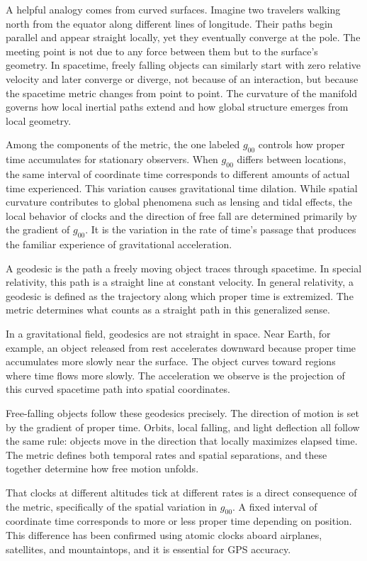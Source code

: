 A helpful analogy comes from curved surfaces. Imagine two travelers walking north from the equator along different lines of longitude. Their paths begin parallel and appear straight locally, yet they eventually converge at the pole. The meeting point is not due to any force between them but to the surface’s geometry. In spacetime, freely falling objects can similarly start with zero relative velocity and later converge or diverge, not because of an interaction, but because the spacetime metric changes from point to point. The curvature of the manifold governs how local inertial paths extend and how global structure emerges from local geometry.

Among the components of the metric, the one labeled \( g_{00} \) controls how proper time accumulates for stationary observers. When \( g_{00} \) differs between locations, the same interval of coordinate time corresponds to different amounts of actual time experienced. This variation causes gravitational time dilation. While spatial curvature contributes to global phenomena such as lensing and tidal effects, the local behavior of clocks and the direction of free fall are determined primarily by the gradient of \( g_{00} \). It is the variation in the rate of time's passage that produces the familiar experience of gravitational acceleration.

A geodesic is the path a freely moving object traces through spacetime. In special relativity, this path is a straight line at constant velocity. In general relativity, a geodesic is defined as the trajectory along which proper time is extremized. The metric determines what counts as a straight path in this generalized sense.

In a gravitational field, geodesics are not straight in space. Near Earth, for example, an object released from rest accelerates downward because proper time accumulates more slowly near the surface. The object curves toward regions where time flows more slowly. The acceleration we observe is the projection of this curved spacetime path into spatial coordinates.

Free-falling objects follow these geodesics precisely. The direction of motion is set by the gradient of proper time. Orbits, local falling, and light deflection all follow the same rule: objects move in the direction that locally maximizes elapsed time. The metric defines both temporal rates and spatial separations, and these together determine how free motion unfolds.

That clocks at different altitudes tick at different rates is a direct consequence of the metric, specifically of the spatial variation in \( g_{00} \). A fixed interval of coordinate time corresponds to more or less proper time depending on position. This difference has been confirmed using atomic clocks aboard airplanes, satellites, and mountaintops, and it is essential for GPS accuracy.

